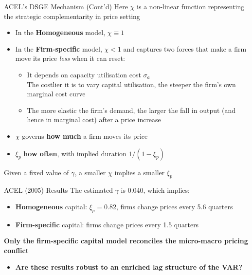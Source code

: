 \documentclass[11pt]{beamer}
\begin{document}
\begin{frame}{ACEL's DSGE Mechanism (Cont'd)}\label{slide:acel_dsge_mechanism}
 Here $\chi$ is a non-linear function representing the strategic complementarity in price setting 
\begin{itemize}
    \item In the \textbf{Homogeneous} model, $\chi \equiv 1$
    \item In the \textbf{Firm-specific} model, $\chi < 1$ and captures two forces that make a firm move its price \textit{less} when it can reset:
    \begin{itemize}
        \item It depends on capacity utilisation cost $\sigma_a$
        \\
              The costlier it is to vary capital utilisation, the steeper the firm's own marginal cost curve
        \item The more elastic the firm's demand, the larger the fall in output (and hence in marginal cost) after a price increase
    \end{itemize}
    \vspace{0.3cm}
    
    \item $\chi$ governs \textbf{how much} a firm moves its price
    \item $\xi_p$ \textbf{how often}, with implied duration $1/(1-\xi_p)$
\end{itemize}
 Given a fixed value of $\gamma$, a smaller $\chi$ implies a smaller $\xi_p$

 \begin{center}
        \hyperlink{slide:acel_mp_shock_prop_mech}{}
    \end{center}

\end{frame}



\begin{frame}{ACEL (2005) Results}
    The estimated $\gamma$ is 0.040, which implies:
    \begin{itemize}
        \item \textbf{Homogeneous} capital: $\xi_p = 0.82$, firms change prices every 5.6 quarters
        \item \textbf{Firm-specific} capital: firms change prices every 1.5 quarters
    \end{itemize}
\vspace{0.1cm}
\textbf{Only the firm-specific capital model reconciles the micro-macro pricing conflict}
\vspace{0.5cm}
\pause

\begin{itemize}
    \item \textbf{\textcolor{PadovaRed}{Are these results robust to an enriched lag structure of the VAR?}}
\end{itemize}
\end{frame}
\end{document}
